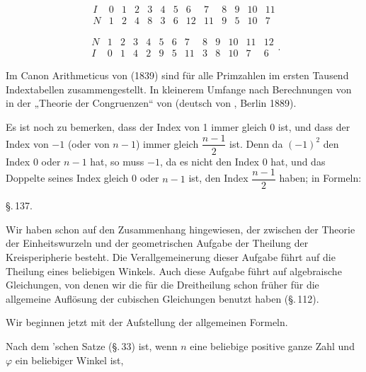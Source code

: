\[
\begin{array}{c|cccccccccccc}
I & 0 & 1 & 2 & 3 & 4 & 5 & 6 & 7 & 8 & 9 & 10 & 11 \\ \hline
N & 1 & 2 & 4 & 8 & 3 & 6 & 12 & 11 & 9 & 5 & 10 & 7
\end{array}
\]

\[
\begin{array}{c|cccccccccccc}
N & 1 & 2 & 3 & 4 & 5 & 6 & 7 & 8 & 9 & 10 & 11 & 12 \\ \hline
I & 0 & 1 & 4 & 2 & 9 & 5 & 11 & 3 & 8 & 10 & 7 & 6
\end{array}.
\]

Im Canon Arithmeticus von  (1839) sind für alle
Primzahlen im ersten Tausend Indextabellen zusammengestellt. In
kleinerem Umfange nach Berechnungen von  in der „Theorie
der Congruenzen“ von  (deutsch von
, Berlin 1889).

Es ist noch zu bemerken, dass der Index von 1 immer gleich 0 ist, und
dass der Index von $-1$ (oder von $n-1$) immer gleich $\dfrac{n-1}{2}$
ist. Denn da $(-1)^2$ den Index 0 oder $n-1$ hat, so muss $-1$, da es
nicht den Index 0 hat, und das Doppelte seines Index gleich 0 oder
$n-1$ ist, den Index $\dfrac{n-1}{2}$ haben; in Formeln:

\begin{center}
\S.\,137.

\end{center}

Wir haben schon auf den Zusammenhang hingewiesen, der zwischen der
Theorie der Einheitswurzeln und der geometrischen Aufgabe der Theilung
der Kreisperipherie besteht. Die Verallgemeinerung dieser Aufgabe
führt auf die Theilung eines beliebigen Winkels. Auch diese Aufgabe
führt auf algebraische Gleichungen, von denen wir die für die
Dreitheilung schon früher für die allgemeine Auflösung der cubischen
Gleichungen benutzt haben (\S.\,112).

Wir beginnen jetzt mit der Aufstellung der allgemeinen Formeln.

Nach dem 'schen Satze (\S.\,33) ist, wenn $n$ eine
beliebige positive ganze Zahl und $\varphi$ ein beliebiger Winkel ist,
